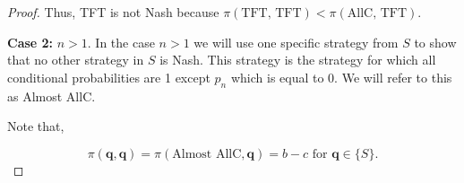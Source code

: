 \documentclass{article}
\theoremstyle{definition}
\begin{document}
\begin{proof}
Thus, TFT is not Nash because \(\pi(\text{TFT, TFT}) < \pi(\text{AllC, TFT})\).

\textbf{Case 2:} \(n>1\). In the case \(n>1\) we will use one specific strategy
from \(S\) to show that no other strategy in \(S\) is Nash. This strategy is the
strategy for which all conditional probabilities are 1 except \(p_n\) which is
equal to 0. We will refer to this as Almost AllC.

Note that,

\[\pi(\mathbf{q}, \mathbf{q}) = \pi( \text{Almost AllC}, \mathbf{q}) = b - c \text { for } \mathbf{q} \in \{S\}.\]












\end{proof}
\end{document}

